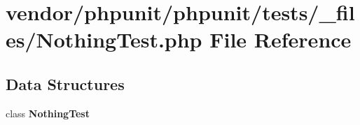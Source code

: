 \section{vendor/phpunit/phpunit/tests/\+\_\+files/\+Nothing\+Test.php File Reference}
\label{_nothing_test_8php}
\subsection*{Data Structures}
\begin{DoxyCompactItemize}
\item 
class {\bf Nothing\+Test}
\end{DoxyCompactItemize}
